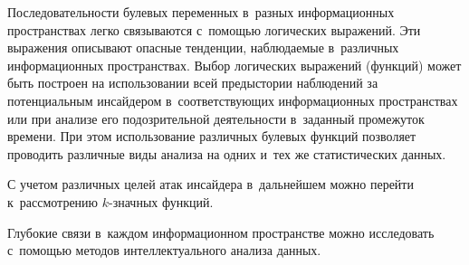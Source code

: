 \begin{multicols}{2}
  Последовательности булевых переменных в~разных информационных 
пространствах легко связываются с~помощью логических выражений. Эти 
выражения описывают опасные тенденции, наблюдаемые в~различных 
информационных пространствах. Выбор логических выражений (функций) 
может быть построен на использовании всей предысто\-рии наблюдений за 
потенциальным инсайдером в~соответствующих информационных 
пространствах или при анализе его подозрительной деятельности в~заданный 
промежуток времени. При этом использование различных булевых функций 
позволяет проводить различные виды анализа на одних и~тех же статистических 
данных. 
  
  С учетом различных целей атак инсайдера в~дальнейшем можно перейти 
к~рассмотрению \mbox{$k$-знач}\-ных функций.
  
  Глубокие связи в~каждом информационном пространстве можно исследовать с~помощью методов интеллектуального анализа данных.
  

\end{multicols}
